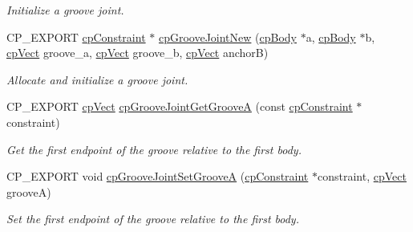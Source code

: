 \begin{DoxyCompactItemize}
\begin{DoxyCompactList}\small\item\em Initialize a groove joint. \end{DoxyCompactList}\item 
\mbox{\label{group__cp_groove_joint_ga4cb69e3be7cb297fdbe4d115d4e532c5}} 
C\+P\+\_\+\+E\+X\+P\+O\+RT \mbox{\hyperlink{structcp_constraint}{cp\+Constraint}} $\ast$ \mbox{\hyperlink{group__cp_groove_joint_ga4cb69e3be7cb297fdbe4d115d4e532c5}{cp\+Groove\+Joint\+New}} (\mbox{\hyperlink{structcp_body}{cp\+Body}} $\ast$a, \mbox{\hyperlink{structcp_body}{cp\+Body}} $\ast$b, \mbox{\hyperlink{structcp_vect}{cp\+Vect}} groove\+\_\+a, \mbox{\hyperlink{structcp_vect}{cp\+Vect}} groove\+\_\+b, \mbox{\hyperlink{structcp_vect}{cp\+Vect}} anchorB)
\begin{DoxyCompactList}\small\item\em Allocate and initialize a groove joint. \end{DoxyCompactList}\item 
\mbox{\label{group__cp_groove_joint_gac1d547a55341236f9659ed31a278b903}} 
C\+P\+\_\+\+E\+X\+P\+O\+RT \mbox{\hyperlink{structcp_vect}{cp\+Vect}} \mbox{\hyperlink{group__cp_groove_joint_gac1d547a55341236f9659ed31a278b903}{cp\+Groove\+Joint\+Get\+GrooveA}} (const \mbox{\hyperlink{structcp_constraint}{cp\+Constraint}} $\ast$constraint)
\begin{DoxyCompactList}\small\item\em Get the first endpoint of the groove relative to the first body. \end{DoxyCompactList}\item 
\mbox{\label{group__cp_groove_joint_gab3d7c3d52caae08d19bd6eadbcad4e2f}} 
C\+P\+\_\+\+E\+X\+P\+O\+RT void \mbox{\hyperlink{group__cp_groove_joint_gab3d7c3d52caae08d19bd6eadbcad4e2f}{cp\+Groove\+Joint\+Set\+GrooveA}} (\mbox{\hyperlink{structcp_constraint}{cp\+Constraint}} $\ast$constraint, \mbox{\hyperlink{structcp_vect}{cp\+Vect}} grooveA)
\begin{DoxyCompactList}\small\item\em Set the first endpoint of the groove relative to the first body. \end{DoxyCompactList}\item 
\mbox{\label{group__cp_groove_joint_gafe3c54f440f638dde48bcc3be3e44cc5}} 

\end{DoxyCompactItemize}
